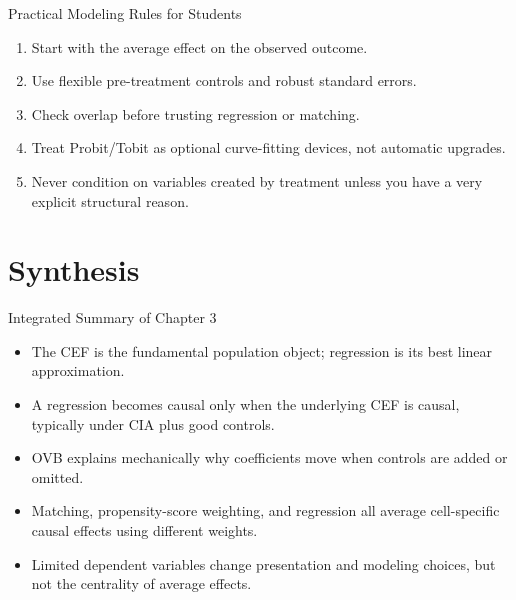 \documentclass[11pt,aspectratio=169]{beamer}
\begin{document}
\begin{frame}{Practical Modeling Rules for Students}
  \begin{enumerate}
    \item Start with the average effect on the observed outcome.
    \item Use flexible pre-treatment controls and robust standard errors.
    \item Check overlap before trusting regression or matching.
    \item Treat Probit/Tobit as optional curve-fitting devices, not automatic upgrades.
    \item Never condition on variables created by treatment unless you have a very explicit structural reason.
  \end{enumerate}
\end{frame}

\section{Synthesis}

\begin{frame}{Integrated Summary of Chapter 3}
  \begin{itemize}
    \item The CEF is the fundamental population object; regression is its best linear approximation.
    \item A regression becomes causal only when the underlying CEF is causal, typically under CIA plus good controls.
    \item OVB explains mechanically why coefficients move when controls are added or omitted.
    \item Matching, propensity-score weighting, and regression all average cell-specific causal effects using different weights.
    \item Limited dependent variables change presentation and modeling choices, but not the centrality of average effects.
  \end{itemize}
\end{frame}
\end{document}
